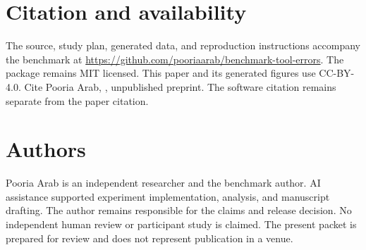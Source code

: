 \documentclass{article}
\begin{document}
\section{Citation and availability}
The source, study plan, generated data, and reproduction instructions accompany the benchmark at \url{https://github.com/pooriaarab/benchmark-tool-errors}. The package remains MIT licensed. This paper and its generated figures use CC-BY-4.0. Cite Pooria Arab, \emph{\PaperTitle}, unpublished preprint. The software citation remains separate from the paper citation.\par
\section{Authors}
Pooria Arab is an independent researcher and the benchmark author. AI assistance supported experiment implementation, analysis, and manuscript drafting. The author remains responsible for the claims and release decision. No independent human review or participant study is claimed. The present packet is prepared for review and does not represent publication in a venue.\par


\end{document}
